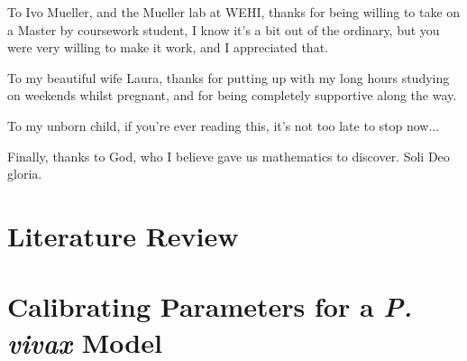 \documentclass{book}
\begin{document}
To Ivo Mueller, and the Mueller lab at WEHI, 
thanks for being willing to take on a Master by 
coursework student, I know it's a bit out of the ordinary, but you were very 
willing to make it work, and I appreciated that.

To my beautiful wife Laura, thanks for putting up with my long hours 
studying on weekends whilst pregnant, and for being completely supportive 
along the way. 

To my unborn child, if you're ever reading this, it's not too late to stop 
now...

Finally, thanks to God, who I believe gave us mathematics to discover. 
Soli Deo gloria.

\tableofcontents

\listoftables
\listoffigures
\listofalgorithms

% 
% 


\newpage


\part{Literature Review}





\part{Calibrating Parameters for a \emph{P. vivax} Model}




\printbibliography

\appendix

\end{document}
